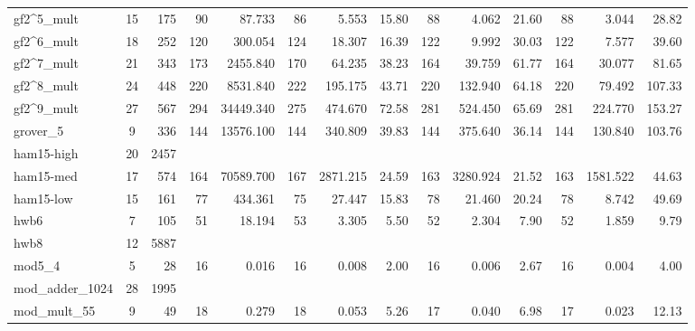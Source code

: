 \begin{table}[htbp]
\begin{tabular}{l c r | r r | r r r | r r r | r r r}
gf2\textasciicircum5\_mult & 15 & 175 & 90 & 87.733 & \cellcolor{bestT}86 & 5.553 & 15.80 & 88 & 4.062 & 21.60 & 88 & \cellcolor{bestTime}3.044 & \cellcolor{bestTime}28.82 \\
gf2\textasciicircum6\_mult & 18 & 252 & \cellcolor{bestT}120 & 300.054 & 124 & 18.307 & 16.39 & 122 & 9.992 & 30.03 & 122 & \cellcolor{bestTime}7.577 & \cellcolor{bestTime}39.60 \\
gf2\textasciicircum7\_mult & 21 & 343 & 173 & 2455.840 & 170 & 64.235 & 38.23 & \cellcolor{bestT}164 & 39.759 & 61.77 & \cellcolor{bestT}164 & \cellcolor{bestTime}30.077 & \cellcolor{bestTime}81.65 \\
gf2\textasciicircum8\_mult & 24 & 448 & \cellcolor{bestT}220 & 8531.840 & 222 & 195.175 & 43.71 & \cellcolor{bestT}220 & 132.940 & 64.18 & \cellcolor{bestT}220 & \cellcolor{bestTime}79.492 & \cellcolor{bestTime}107.33 \\
gf2\textasciicircum9\_mult & 27 & 567 & 294 & 34449.340 & \cellcolor{bestT}275 & 474.670 & 72.58 & 281 & 524.450 & 65.69 & 281 & \cellcolor{bestTime}224.770 & \cellcolor{bestTime}153.27 \\
grover\_5 & 9 & 336 & \cellcolor{bestT}144 & 13576.100 & \cellcolor{bestT}144 & 340.809 & 39.83 & \cellcolor{bestT}144 & 375.640 & 36.14 & \cellcolor{bestT}144 & \cellcolor{bestTime}130.840 & \cellcolor{bestTime}103.76 \\
ham15-high & 20 & 2457 & & & & & & & & & & & \\
ham15-med & 17 & 574 & 164 & 70589.700 & 167 & 2871.215 & 24.59 & \cellcolor{bestT}163 & 3280.924 & 21.52 & \cellcolor{bestT}163 & \cellcolor{bestTime}1581.522 & \cellcolor{bestTime}44.63 \\
ham15-low & 15 & 161 & 77 & 434.361 & \cellcolor{bestT}75 & 27.447 & 15.83 & 78 & 21.460 & 20.24 & 78 & \cellcolor{bestTime}8.742 & \cellcolor{bestTime}49.69 \\
hwb6 & 7 & 105 & \cellcolor{bestT}51 & 18.194 & 53 & 3.305 & 5.50 & 52 & 2.304 & 7.90 & 52 & \cellcolor{bestTime}1.859 & \cellcolor{bestTime}9.79 \\
hwb8 & 12 & 5887 & & & & & & & & & & & \\
mod5\_4 & 5 & 28 & \cellcolor{bestT}16 & 0.016 & \cellcolor{bestT}16 & 0.008 & 2.00 & \cellcolor{bestT}16 & 0.006 & 2.67 & \cellcolor{bestT}16 & \cellcolor{bestTime}0.004 & \cellcolor{bestTime}4.00 \\
mod\_adder\_1024 & 28 & 1995 & & & & & & & & & & & \\
mod\_mult\_55 & 9 & 49 & 18 & 0.279 & 18 & 0.053 & 5.26 & \cellcolor{bestT}17 & 0.040 & 6.98 & \cellcolor{bestT}17 & \cellcolor{bestTime}0.023 & \cellcolor{bestTime}12.13 \\

\end{tabular}
\end{table}
